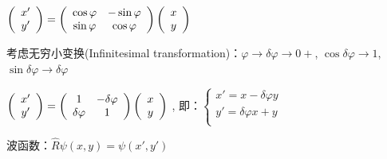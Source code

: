 \begin{center}
$\left( {\begin{array}{*{20}c}
   {x'}  \\
   {y'}  \\
\end{array}} \right) = \left( {\begin{array}{*{20}c}
   {\cos \varphi } & { - \sin \varphi }  \\
   {\sin \varphi } & {\cos \varphi }  \\
\end{array}} \right)\left( {\begin{array}{*{20}c}
   x  \\
   y  \\
\end{array}} \right)$
\end{center}

考虑无穷小变换(Infinitesimal transformation)：$\varphi  \to \delta
\varphi  \to 0 + $, $\cos \delta \varphi  \to 1$, $\sin \delta
\varphi  \to \delta \varphi $


\begin{center}
$\left( {\begin{array}{*{20}c}
   {x'}  \\
   {y'}  \\
\end{array}} \right) = \left( {\begin{array}{*{20}c}
   1 & { - \delta \varphi }  \\
   {\delta \varphi } & 1  \\
\end{array}} \right)\left( {\begin{array}{*{20}c}
   x  \\
   y  \\
\end{array}} \right)$
, 即：$\left\{ \begin{array}{l}
 x' = x - \delta \varphi y \\
 y' = \delta \varphi x + y \\
 \end{array} \right.$
\end{center}

波函数：$\widehat R\psi \left( {x,y} \right) = \psi \left( {x',y'} \right)$

